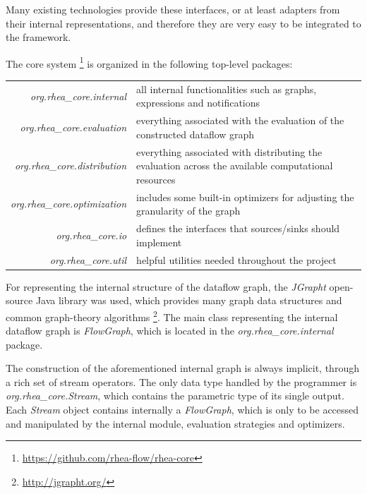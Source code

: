 \documentclass{dithesis}
\begin{document}
Many existing technologies provide these interfaces, or at least adapters from their internal representations, and therefore they are very easy to be integrated to the framework.

\newpage

The core system \footnote{\url{https://github.com/rhea-flow/rhea-core}} is organized in the following top-level packages:

\begin{tabularx}{\textwidth}{rX}
	\textit{org.rhea\_core.internal} 
	& all internal functionalities such as graphs, expressions and notifications \\
	\textit{org.rhea\_core.evaluation}
	& everything associated with the evaluation of the constructed dataflow graph \\
	\textit{org.rhea\_core.distribution}
	& everything associated with distributing the evaluation across the available computational resources \\
	\textit{org.rhea\_core.optimization}	
	& includes some built-in optimizers for adjusting the  granularity of the graph \\
	\textit{org.rhea\_core.io}
	& defines the interfaces that sources/sinks should implement \\
	\textit{org.rhea\_core.util}
	& helpful utilities needed throughout the project \\
\end{tabularx}


For representing the internal structure of the dataflow graph, the \textit{JGrapht} open-source Java library was used, which provides many graph data structures and common graph-theory algorithms \footnote{\url{http://jgrapht.org/}}. The main class representing the internal dataflow graph is \textit{FlowGraph},  which is located in the \textit{org.rhea\_core.internal} package.


The construction of the aforementioned internal graph is always implicit, through a rich set of stream operators. The only data type handled by the programmer is \textit{org.rhea\_core.Stream}, which contains the parametric type of its single output. Each \textit{Stream} object contains internally a \textit{FlowGraph}, which is only to be accessed and manipulated by the internal module, evaluation strategies and optimizers.
\end{document}
